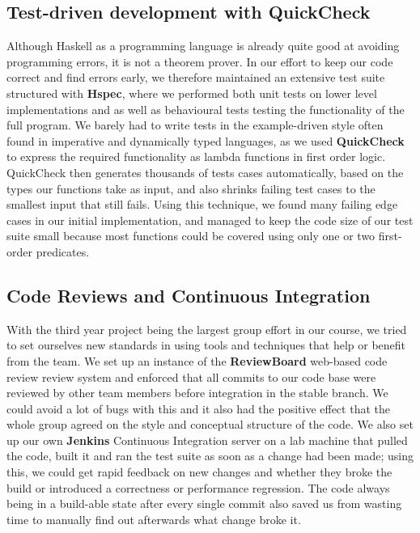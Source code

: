 \subsection*{Test-driven development with QuickCheck}
Although Haskell as a programming language is already quite good at avoiding programming errors, it is not a theorem prover.
In our effort to keep our code correct and find errors early, we therefore maintained an extensive test suite structured with \textbf{Hspec}, where we performed both unit tests on lower level implementations and as well as behavioural tests testing the functionality of the full program.
We barely had to write tests in the example-driven style often found in imperative and dynamically typed languages, as we used \textbf{QuickCheck} to express the required functionality as lambda functions in first order logic. QuickCheck then generates thousands of tests cases automatically, based on the types our functions take as input, and also shrinks failing test cases to the smallest input that still fails. Using this technique, we found many failing edge cases in our initial implementation, and managed to keep the code size of our test suite small because most functions could be covered using only one or two first-order predicates.

\subsection*{Code Reviews and Continuous Integration}
With the third year project being the largest group effort in our course, we tried to set ourselves new standards in using tools and techniques that help or benefit from the team. We set up an instance of the \textbf{ReviewBoard} web-based code review review system and enforced that all commits to our code base were reviewed by other team members before integration in the stable branch. We could avoid a lot of bugs with this and it also had the positive effect that the whole group agreed on the style and conceptual structure of the code.
We also set up our own \textbf{Jenkins} Continuous Integration server on a lab machine that pulled the code, built it and ran the test suite as soon as a change had been made; using this, we could get rapid feedback on new changes and whether they broke the build or introduced a correctness or performance regression. The code always being in a build-able state after every single commit also saved us from wasting time to manually find out afterwards what change broke it.



